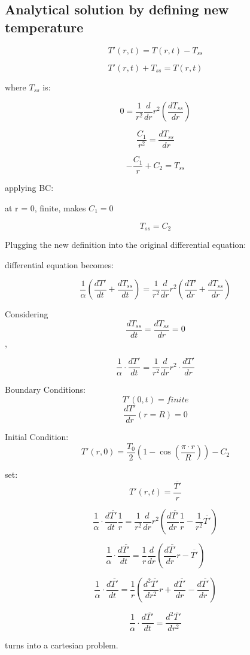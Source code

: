 \documentclass[12pt,letterpaper]{article}
\begin{document}
\subsection{Analytical solution by defining new temperature}

\[T'(r,t) = T(r,t) - T_{ss}\]

\[T'(r,t) + T_{ss} = T(r,t) \]


where $T_{ss}$ is:


\[0 = \frac{1}{r^2} \frac{d}{dr} r^2 (\frac{dT_{ss}}{dr})\]

\[\frac{C_1}{r^2} = \frac{dT_{ss}}{dr}\]

\[-\frac{C_1}{r} + C_2 = T_{ss}\]

applying BC:

at r = 0, finite, makes  $C_1 = 0$

\[T_{ss} = C_2\]

Plugging the new definition into the original differential equation:

differential equation becomes:

\[\frac{1}{\alpha} (\frac{dT'}{dt} + \frac{dT_{ss}}{dt}) = \frac{1}{r^2} \frac{d}{dr} r^2 (\frac{dT'}{dr} + \frac{dT_{ss}}{dr})\]

Considering \[\frac{dT_{ss}}{dt} = \frac{dT_{ss}}{dr} = 0\],

\[\frac{1}{\alpha} \cdot \frac{dT'}{dt} = \frac{1}{r^2} \frac{d}{dr} r^2 \cdot \frac{dT'}{dr} \]

Boundary Conditions:
\[T'(0,t)  = finite \]
\[\frac{dT'}{dr} (r = R) = 0 \]

Initial Condition:
\[T'(r,0) = \frac{T_0}{2} (1-\cos{(\frac{\pi \cdot r}{R})}) - C_2 \]

set:
\[T'(r,t) = \frac{\overline{T'}}{r} \]


\[\frac{1}{\alpha} \cdot \frac{d\overline{T'}}{dt} \frac{1}{r} = \frac{1}{r^2} \frac{d}{dr} r^2 (\frac{d\overline{T'}}{dr} \frac{1}{r} - \frac{1}{r^2} \overline{T'}) \]

\[\frac{1}{\alpha} \cdot \frac{d\overline{T'}}{dt} = \frac{1}{r} \frac{d}{dr} (\frac{d\overline{T'}}{dr} r - \overline{T'}) \]

\[\frac{1}{\alpha} \cdot \frac{d\overline{T'}}{dt} = \frac{1}{r} (\frac{d^2\overline{T'}}{dr^2} r + \frac{d\overline{T'}}{dr} - \frac{d\overline{T'}}{dr}) \]

\[\frac{1}{\alpha} \cdot \frac{d\overline{T'}}{dt} = \frac{d^2\overline{T'}}{dr^2} \]

turns into a cartesian problem.
\end{document}
